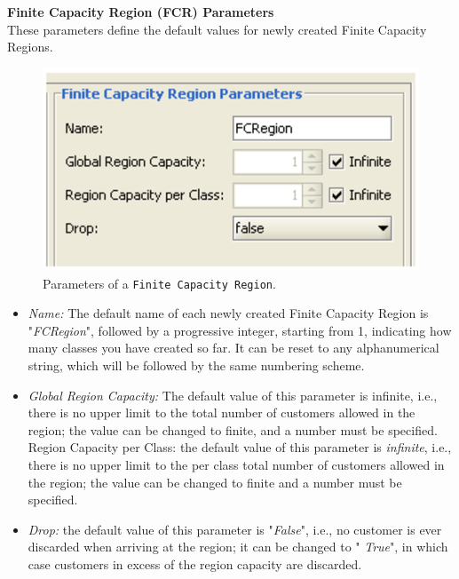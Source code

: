 \noindent \textbf{Finite Capacity Region (FCR) Parameters}\\
These parameters define the default values for newly created
Finite Capacity Regions.\\
\begin{figure}[htb]
    \begin{center}
        \includegraphics[scale=.5]{img/jsimg/9.5.eps}
    \end{center}
    \caption{Parameters of a \texttt{Finite Capacity Region}.}
    \label{fig:parfcreg}
\end{figure}
\begin{itemize}
\item \emph{Name:} The default name of each newly created Finite
Capacity Region is "\emph{FCRegion}", followed by a progressive
integer, starting from 1, indicating how many classes you have
created so far. It can be reset to any alphanumerical string,
which will be followed by the same numbering scheme. \item
\emph{Global Region Capacity:} The default value of this parameter
is infinite, i.e., there is no upper limit to the total number of
customers allowed in the region; the value can be changed to
finite, and a number must be specified. Region Capacity per Class:
the default value of this parameter is \emph{infinite}, i.e.,
there is no upper limit to the per class total number of customers
allowed in the region; the value can be changed to finite and a
number must be specified. \item \emph{Drop:} the default value of
this parameter is "\emph{False}", i.e., no customer is ever
discarded when arriving at the region; it can be changed to "
\emph{True}", in which case customers in excess of the region
capacity are discarded.
\end{itemize}

